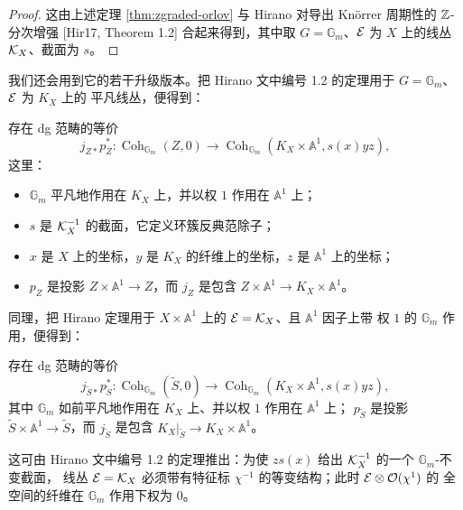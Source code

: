 \begin{proof}
这由上述定理 \ref{thm:zgraded-orlov} 与 Hirano 对导出 Knörrer 周期性的 $\mathbb{Z}$-分次增强
[Hir17, Theorem 1.2] 合起来得到，其中取 $G=\mathbb G_m$、$\mathcal{E}$ 为 $X$ 上的线丛 $\mathcal{K}_X$、截面为
$s$。
\end{proof}


我们还会用到它的若干升级版本。把 Hirano 文中编号 1.2 的定理用于 $G=\mathbb G_m$、$\mathcal{E}$ 为 $K_X$ 上的
平凡线丛，便得到：

\begin{proposition}\label{prop:6-1-8}
存在 dg 范畴的等价
\[
j_{Z*}p_Z^*\colon\operatorname{Coh}_{\mathbb G_m}(Z,0)\to\operatorname{Coh}_{\mathbb G_m}(K_X\times\mathbb A^1,s(x)yz),
\]
这里：
\begin{itemize}
\item $\mathbb G_m$ 平凡地作用在 $K_X$ 上，并以权 $1$ 作用在 $\mathbb A^1$ 上；
\item $s$ 是 $\mathcal{K}_X^{-1}$ 的截面，它定义环簇反典范除子；
\item $x$ 是 $X$ 上的坐标，$y$ 是 $K_X$ 的纤维上的坐标，$z$ 是 $\mathbb A^1$ 上的坐标；
\item $p_Z$ 是投影 $Z\times\mathbb A^1\to Z$，而 $j_Z$ 是包含
  $Z\times\mathbb A^1\to K_X\times\mathbb A^1$。
\end{itemize}
\end{proposition}

同理，把 Hirano 定理用于 $X\times\mathbb A^1$ 上的 $\mathcal{E}=\mathcal{K}_X$、且 $\mathbb A^1$ 因子上带
权 $1$ 的 $\mathbb G_m$ 作用，便得到：

\begin{proposition}\label{prop:6-1-9}
存在 dg 范畴的等价
\[
j_{\tilde S*}p_{\tilde S}^*\colon\operatorname{Coh}_{\mathbb G_m}(\tilde S,0)
\to\operatorname{Coh}_{\mathbb G_m}(K_X\times\mathbb A^1,s(x)yz),
\]
其中 $\mathbb G_m$ 如前平凡地作用在 $K_X$ 上、并以权 $1$ 作用在 $\mathbb A^1$ 上；
$p_{\tilde S}$ 是投影 $\tilde S\times\mathbb A^1\to\tilde S$，而 $j_{\tilde S}$ 是包含
$K_X|_{\tilde S}\to K_X\times\mathbb A^1$。
\end{proposition}

这可由 Hirano 文中编号 1.2 的定理推出：为使 $zs(x)$ 给出 $\mathcal{K}_X^{-1}$ 的一个 $\mathbb G_m$-不变截面，
线丛 $\mathcal{E}=\mathcal{K}_X$ 必须带有特征标 $\chi^{-1}$ 的等变结构；此时 $\mathcal{E}\otimes\mathcal{O}(\chi^1)$ 的
全空间的纤维在 $\mathbb G_m$ 作用下权为 $0$。

